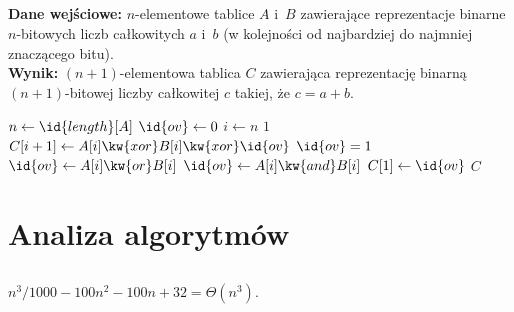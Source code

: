 \subsection{} %
\noindent\textbf{Dane wejściowe:} $n$-elementowe tablice $A$ i~$B$ zawierające reprezentacje binarne $n$-bitowych liczb całkowitych $a$ i~$b$ (w kolejności od najbardziej do najmniej znaczącego bitu). \\ 
\textbf{Wynik:} $(n+1)$-elementowa tablica $C$ zawierająca reprezentację binarną $(n+1)$-bitowej liczby całkowitej $c$ takiej, że $c=a+b$.
\begin{codebox}
\li	$n\gets\id{length}[A]$
\li	$\id{ov}\gets 0$
\li	\For $i\gets n$ \Downto $1$ \label{li:bin-add-for2-begin}
\li		\Do
			$C[i+1]\gets A[i]\kw{xor}B[i]\kw{xor}\id{ov}$ \label{li:bin-add-xor}
\li			\If $\id{ov}=1$ \label{li:bin-add-if}
\li				\Then
					$\id{ov}\gets A[i]\kw{or}B[i]$
\li				\Else
					$\id{ov}\gets A[i]\kw{and}B[i]$
				\End
		\End \label{li:bin-add-for2-end}
\li	$C[1]\gets \id{ov}$
\li	\Return $C$
\end{codebox}

\section{Analiza algorytmów}

\subsection{} %
\begin{center}
	$n^3/1000-100n^2-100n+32 = \Theta(n^3).$
\end{center}

